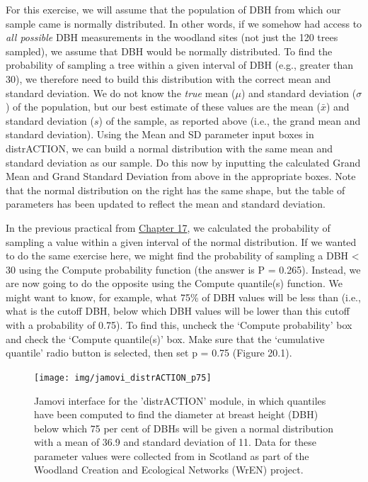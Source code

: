 \documentclass[
  openany]{krantz}
\begin{document}
For this exercise, we will assume that the population of DBH from which our sample came is normally distributed.
In other words, if we somehow had access to \emph{all possible} DBH measurements in the woodland sites (not just the 120 trees sampled), we assume that DBH would be normally distributed.
To find the probability of sampling a tree within a given interval of DBH (e.g., greater than 30), we therefore need to build this distribution with the correct mean and standard deviation.
We do not know the \emph{true} mean (\(\mu\)) and standard deviation (\(\sigma\)) of the population, but our best estimate of these values are the mean (\(\bar{x}\)) and standard deviation (\(s\)) of the sample, as reported above (i.e., the grand mean and standard deviation).
Using the Mean and SD parameter input boxes in distrACTION, we can build a normal distribution with the same mean and standard deviation as our sample.
Do this now by inputting the calculated Grand Mean and Grand Standard Deviation from above in the appropriate boxes.
Note that the normal distribution on the right has the same shape, but the table of parameters has been updated to reflect the mean and standard deviation.

In the previous practical from \protect\hyperlink{Chapter_17}{Chapter 17}, we calculated the probability of sampling a value within a given interval of the normal distribution.
If we wanted to do the same exercise here, we might find the probability of sampling a DBH \textless{} 30 using the Compute probability function (the answer is P = 0.265).
Instead, we are now going to do the opposite using the Compute quantile(s) function.
We might want to know, for example, what 75\% of DBH values will be less than (i.e., what is the cutoff DBH, below which DBH values will be lower than this cutoff with a probability of 0.75).
To find this, uncheck the `Compute probability' box and check the `Compute quantile(s)' box.
Make sure that the `cumulative quantile' radio button is selected, then set p = 0.75 (Figure 20.1).

\begin{figure}
\texttt{[image: img/jamovi\_distrACTION\_p75]} \caption{Jamovi interface for the 'distrACTION' module, in which quantiles have been computed to find the diameter at breast height (DBH) below which 75 per cent of DBHs will be given a normal distribution with a mean of 36.9 and standard deviation of 11. Data for these parameter values were collected from in Scotland as part of the Woodland Creation and Ecological Networks (WrEN) project.}\label{fig:unnamed-chunk-79}
\end{figure}
\end{document}
